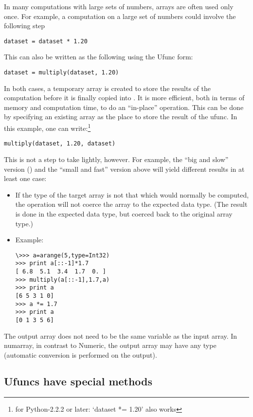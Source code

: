 In many computations with large sets of numbers, arrays are often used only
once. For example, a computation on a large set of numbers could involve the
following step
\begin{verbatim}
dataset = dataset * 1.20 
\end{verbatim}
This can also be written as the following using the Ufunc form:
\begin{verbatim}
dataset = multiply(dataset, 1.20)
\end{verbatim}
In both cases, a temporary array is created to store the results of the
computation before it is finally copied into . It is
more efficient, both in terms of memory and computation time, to do an
``in-place'' operation.  This can be done by specifying an existing array as
the place to store the result of the ufunc. In this example, one can 
write:\footnote[1]{for Python-2.2.2 or later: `dataset *= 1.20' also works}
\begin{verbatim}
multiply(dataset, 1.20, dataset) 
\end{verbatim}
This is not a step to take lightly, however. For example, the ``big and slow''
version () and the ``small and fast'' version
above will yield different results in at least one case:
\begin{itemize}
\item If the type of the target array is not that which would normally be
   computed, the operation will not coerce the array to the expected data type.
   (The result is done in the expected data type, but coerced back to the
   original array type.)
\item Example:
\begin{verbatim}
\>>> a=arange(5,type=Int32)
>>> print a[::-1]*1.7
[ 6.8  5.1  3.4  1.7  0. ]
>>> multiply(a[::-1],1.7,a)
>>> print a
[6 5 3 1 0]
>>> a *= 1.7
>>> print a
[0 1 3 5 6]
\end{verbatim}
\end{itemize}

The output array does not need to be the same variable as the input array. In
numarray, in contrast to Numeric, the output array may have any type (automatic
conversion is performed on the output).

\subsection{Ufuncs have special methods}
\label{sec:ufuncs-have-special-methods}


